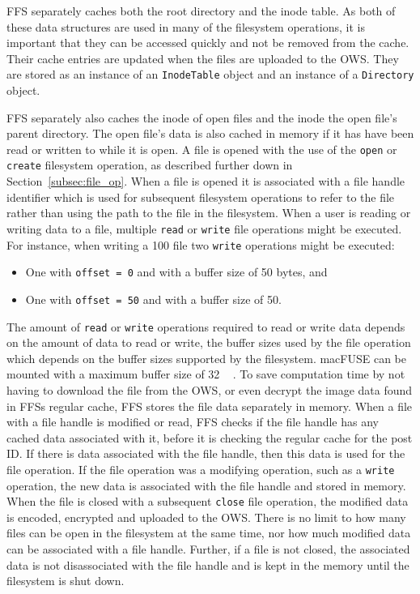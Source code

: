 \gls{FFS} separately caches both the root directory and the inode table. As both of these data structures are used in many of the filesystem operations, it is important that they can be accessed quickly and not be removed from the cache. Their cache entries are updated when the files are uploaded to the \gls{OWS}. They are stored as an instance of an \texttt{InodeTable} object and an instance of a \texttt{Directory} object.

\gls{FFS} separately also caches the inode of open files and the inode the open file's parent directory. The open file's data is also cached in memory if it has have been read or written to while it is open. A file is opened with the use of the \texttt{open} or \texttt{create} filesystem operation, as described further down in Section~\ref{subsec:file_op}. When a file is opened it is associated with a file handle identifier which is used for subsequent filesystem operations to refer to the file rather than using the path to the file in the filesystem. When a user is reading or writing data to a file, multiple \texttt{read} or \texttt{write} file operations might be executed. For instance, when writing a \SI{100}{\byte} file two \texttt{write} operations might be executed:
\begin{itemize}
	\item One with \texttt{offset = 0} and with a buffer size of \SI{50}{\byte} bytes, and
	\item One with \texttt{offset = 50} and with a buffer size of \SI{50}{\byte}.
\end{itemize}
The amount of \texttt{read} or \texttt{write} operations required to read or write data depends on the amount of data to read or write, the buffer sizes used by the file operation which depends on the buffer sizes supported by the filesystem. macFUSE can be mounted with a maximum buffer size of \SI{32}{\mega\byte}\,\cite{fleischerMountOptionsOsxfuse2020}. To save computation time by not having to download the file from the \gls{OWS}, or even decrypt the image data found in \gls{FFS}s regular cache, \gls{FFS} stores the file data separately in memory. When a file with a file handle is modified or read, \gls{FFS} checks if the file handle has any cached data associated with it, before it is checking the regular cache for the post ID. If there is data associated with the file handle, then this data is used for the file operation. If the file operation was a modifying operation, such as a \texttt{write} operation, the new data is associated with the file handle and stored in memory. When the file is closed with a subsequent \texttt{close} file operation, the modified data is encoded, encrypted and uploaded to the \gls{OWS}. There is no limit to how many files can be open in the filesystem at the same time, nor how much modified data can be associated with a file handle. Further, if a file is not closed, the associated data is not disassociated with the file handle and is kept in the memory until the filesystem is shut down.

